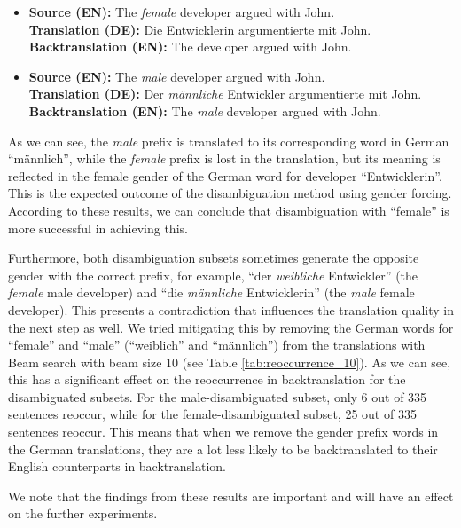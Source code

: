 \begin{itemize}
    \item \textbf{Source (EN):} The \textit{female} developer argued with John. \\
    \textbf{Translation (DE):} Die Entwicklerin argumentierte mit John. \\
    \textbf{Backtranslation (EN):} The developer argued with John.
    
    \item \textbf{Source (EN):} The \textit{male} developer argued with John. \\
    \textbf{Translation (DE):} Der \textit{männliche} Entwickler argumentierte mit John. \\
    \textbf{Backtranslation (EN):} The \textit{male} developer argued with John.
\end{itemize}

As we can see, the \textit{male} prefix is translated to its corresponding word in German “männlich”, while the \textit{female} prefix is lost in the translation, but its meaning is reflected in the female gender of the German word for developer “Entwicklerin”. This is the expected outcome of the disambiguation method using gender forcing. According to these results, we can conclude that disambiguation with “female” is more successful in achieving this.

Furthermore, both disambiguation subsets sometimes generate the opposite gender with the correct prefix, for example, “der \textit{weibliche} Entwickler” (the \textit{female} male developer) and “die \textit{männliche} Entwicklerin” (the \textit{male} female developer). This presents a contradiction that influences the translation quality in the next step as well. We tried mitigating this by removing the German words for “female” and “male” (“weiblich” and “männlich”) from the translations with Beam search with beam size 10 (see Table \ref{tab:reoccurrence_10}). As we can see, this has a significant effect on the reoccurrence in backtranslation for the disambiguated subsets. For the male-disambiguated subset, only 6 out of 335 sentences reoccur, while for the female-disambiguated subset, 25 out of 335 sentences reoccur. This means that when we remove the gender prefix words in the German translations, they are a lot less likely to be backtranslated to their English counterparts in backtranslation.  

We note that the findings from these results are important and will have an effect on the further experiments.

